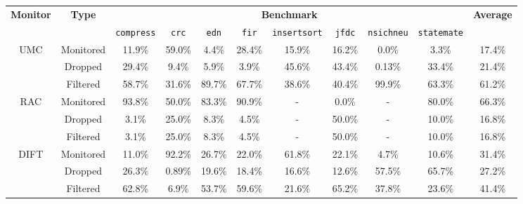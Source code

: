 

\begin{tabular}{|c|c|c|c|c|c|c|c|c|c|c|}
\hline

\multirow{2}{*}{\bf Monitor} & \multirow{2}{*}{\bf Type} & \multicolumn{8}{c|}{\bf Benchmark} & \multirow{2}{*}{\bf Average} \\ \cline{3-10}
 & & {\tt compress} & {\tt crc} & {\tt edn} & {\tt fir} & {\tt insertsort} & {\tt jfdc} & {\tt nsichneu} & {\tt statemate} & \\ \hline \hline

\multirow{3}{*}{UMC}
& Monitored & 11.9\% & 59.0\% & 4.4\% & 28.4\% & 15.9\% & 16.2\% & 0.0\% & 3.3\% & 17.4\% \\ \cline{2-11}
 & Dropped & 29.4\% & 9.4\% & 5.9\% & 3.9\% & 45.6\% & 43.4\% & 0.13\% & 33.4\% & 21.4\% \\ \cline{2-11}
 & Filtered & 58.7\% & 31.6\% & 89.7\% & 67.7\% & 38.6\% & 40.4\% & 99.9\% & 63.3\% & 61.2\% \\

\hline
\hline

\multirow{3}{*}{RAC} 
 & Monitored & 93.8\% & 50.0\% & 83.3\% & 90.9\% & - & 0.0\% & - & 80.0\% & 66.3\% \\ \cline{2-11}
  & Dropped & 3.1\% & 25.0\% & 8.3\% & 4.5\% & - & 50.0\% & - & 10.0\% & 16.8\% \\ \cline{2-11}
   & Filtered & 3.1\% & 25.0\% & 8.3\% & 4.5\% & - & 50.0\% & - & 10.0\% & 16.8\% \\
 
\hline
\hline

\multirow{3}{*}{DIFT} 
 & Monitored & 11.0\% & 92.2\% & 26.7\% & 22.0\% & 61.8\% & 22.1\% & 4.7\% & 10.6\% & 31.4\% \\ \cline{2-11}
  & Dropped & 26.3\% & 0.89\% & 19.6\% & 18.4\% & 16.6\% & 12.6\% & 57.5\% & 65.7\% & 27.2\% \\ \cline{2-11}
   & Filtered & 62.8\% & 6.9\% & 53.7\% & 59.6\% & 21.6\% & 65.2\% & 37.8\% & 23.6\% & 41.4\% \\

\hline

\end{tabular}
